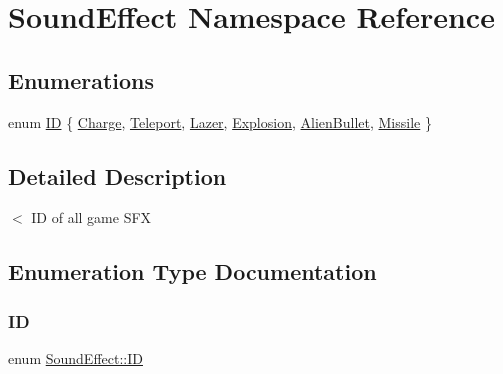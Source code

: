 \hypertarget{namespace_sound_effect}{}\section{Sound\+Effect Namespace Reference}
\label{namespace_sound_effect}
\subsection*{Enumerations}
\begin{DoxyCompactItemize}
\item 
enum \hyperlink{namespace_sound_effect_a11ffbf1eb89e85a34cbfd5a59b2cd9cb}{ID} \{ \newline
\hyperlink{namespace_sound_effect_a11ffbf1eb89e85a34cbfd5a59b2cd9cba089c46ca5650d2908d73313697639681}{Charge}, 
\hyperlink{namespace_sound_effect_a11ffbf1eb89e85a34cbfd5a59b2cd9cba704ba2e853835e27d1a7269ba15a815e}{Teleport}, 
\hyperlink{namespace_sound_effect_a11ffbf1eb89e85a34cbfd5a59b2cd9cba5ffead776f4775d199243408e408a7e1}{Lazer}, 
\hyperlink{namespace_sound_effect_a11ffbf1eb89e85a34cbfd5a59b2cd9cba67b990b7e72c8a371574775b9c007c0c}{Explosion}, 
\newline
\hyperlink{namespace_sound_effect_a11ffbf1eb89e85a34cbfd5a59b2cd9cba641cefad0985cde466d6de37d5b020d1}{Alien\+Bullet}, 
\hyperlink{namespace_sound_effect_a11ffbf1eb89e85a34cbfd5a59b2cd9cba790398f6a6f4c296cd5d437c2a8c8da5}{Missile}
 \}
\end{DoxyCompactItemize}


\subsection{Detailed Description}
$<$ ID of all game S\+FX 

\subsection{Enumeration Type Documentation}
\mbox{\label{namespace_sound_effect_a11ffbf1eb89e85a34cbfd5a59b2cd9cb}} 
\subsubsection{\texorpdfstring{ID}{ID}}
{\footnotesize\ttfamily enum \hyperlink{namespace_sound_effect_a11ffbf1eb89e85a34cbfd5a59b2cd9cb}{Sound\+Effect\+::\+ID}}


